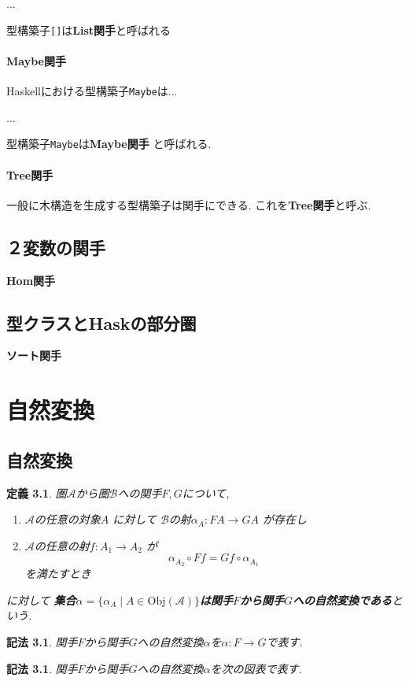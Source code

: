 \documentclass[dvipdfmx]{jsbook}
\theoremstyle{plain}
\newtheorem{Def}[thm]{定義}
\newtheorem{Notation}[thm]{記法}
\begin{document}
...

型構築子\verb|[]|は{\bf List関手}と呼ばれる
\subsubsection{Maybe関手}
Haskellにおける型構築子\verb|Maybe|は...

...

型構築子\verb|Maybe|は{\bf Maybe関手}
と呼ばれる.
\subsubsection{Tree関手}
一般に木構造を生成する型構築子は関手にできる. これを{\bf Tree関手}と呼ぶ.


\section{２変数の関手}
{\bf Hom関手}

\section{型クラスとHaskの部分圏}
{\bf ソート関手}


\chapter{自然変換}
\section{自然変換}
\begin{Def}
圏$\mathscr{A}$から圏$\mathscr{B}$への関手$F,G$について,
\begin{enumerate}
\item $\mathscr{A}$の任意の対象$A$ 
に対して
$\mathscr{B}$の射$\alpha_A:FA\rightarrow GA$
が存在し
\item $\mathscr{A}$の任意の射$f:A_1\rightarrow A_2$
が
\[
\alpha_{A_2}\circ Ff
=Gf\circ\alpha_{A_1}
\]
を満たすとき
\end{enumerate}に対して
{\bf 集合$\alpha=\{\alpha_A\mid A\in\mathrm{Obj}(\mathscr{A})\}$は関手$F$から関手$G$への自然変換である}という.
\end{Def}
\begin{Notation}
関手$F$から関手$G$への自然変換$\alpha$を$\alpha:F\rightarrow G$で表す.
\end{Notation}
\begin{Notation}
関手$F$から関手$G$への自然変換$\alpha$を次の図表で表す.
\end{Notation}
\end{document}
